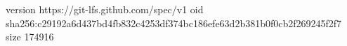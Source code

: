 version https://git-lfs.github.com/spec/v1
oid sha256:c29192a6d437bd4fb832c4253df374bc186efe63d2b381b0f0cb2f269245f2f7
size 174916
